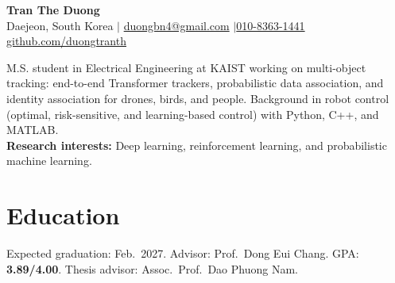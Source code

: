 \begin{center}
  {\fontsize{23}{26}\selectfont\bfseries Tran The Duong}\\[4pt]
  Daejeon, South Korea \enspace$\vert$\enspace
  \href{mailto:duongbn4@gmail.com}{duongbn4@gmail.com}
  \enspace$\vert$\enspace \href{tel:+821083631441}{010-8363-1441}\\[2pt]
  \href{https://github.com/duongtranth}{github.com/duongtranth}
\end{center}
\vspace{-4pt}
M.S. student in Electrical Engineering at KAIST working on multi-object tracking: end-to-end Transformer trackers, probabilistic data association, and identity association for drones, birds, and people. Background in robot control (optimal, risk-sensitive, and learning-based control) with Python, C++, and MATLAB.\\[3pt]
\textbf{Research interests:} Deep learning, reinforcement learning, and probabilistic machine learning.

\section{Education}
Expected graduation: Feb.\ 2027. Advisor: Prof.\ Dong Eui Chang.
GPA: \textbf{3.89/4.00}. Thesis advisor: Assoc.\ Prof.\ Dao Phuong Nam.
